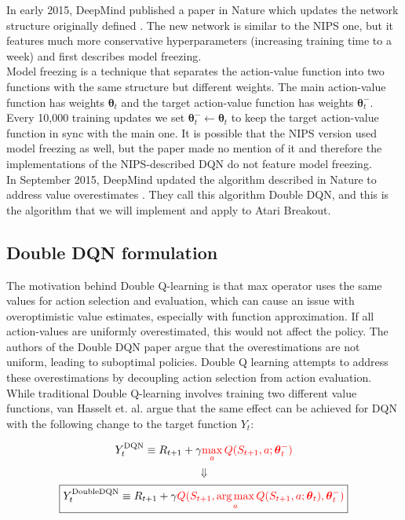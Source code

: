 \documentclass{article}
\DeclareMathOperator*{\argmax}{arg\,max}
\begin{document}
In early 2015, DeepMind published a paper in Nature which updates the network structure originally defined \cite{dmnature}. The new network is similar to the NIPS one, but it features much more conservative hyperparameters (increasing training time to a week) and first describes model freezing. \\

Model freezing is a technique that separates the action-value function into two functions with the same structure but different weights. The main action-value function has weights $\boldsymbol{\theta}_t$ and the target action-value function has weights $\boldsymbol{\theta}_t^-$. Every 10,000 training updates we set $\boldsymbol{\theta}_t^- \leftarrow \boldsymbol{\theta}_t$ to keep the target action-value function in sync with the main one. It is possible that the NIPS version used model freezing as well, but the paper made no mention of it and therefore the implementations of the NIPS-described DQN do not feature model freezing. \\

In September 2015, DeepMind updated the algorithm described in Nature to address value overestimates \cite{dmdoubl}. They call this algorithm Double DQN, and this is the algorithm that we will implement and apply to Atari Breakout.

\subsection{Double DQN formulation}
  The motivation behind Double Q-learning is that max operator uses the same values for action selection and evaluation, which can cause an issue with overoptimistic value estimates, especially with function approximation. If all action-values are uniformly overestimated, this would not affect the policy. The authors of the Double DQN paper argue that the overestimations are not uniform, leading to suboptimal policies. Double Q learning attempts to address these overestimations by decoupling action selection from action evaluation. While traditional Double Q-learning involves training two different value functions, van Hasselt et. al. argue that the same effect can be achieved for DQN with the following change to the target function $Y_t$:

  \[Y_t^{\textrm{DQN}} \equiv R_{t+1} + \gamma \textcolor{red}{\max_{a} Q(S_{t+1},a;\boldsymbol{\theta}_t^-)} \]
  \[ \Downarrow \]
  \[\boxed{Y_t^{\textrm{DoubleDQN}} \equiv R_{t+1} + \gamma \textcolor{red}{Q(S_{t+1},\argmax_a Q(S_{t+1},a;\boldsymbol{\theta}_t),\boldsymbol{\theta}_t^-)}} \]
\end{document}
